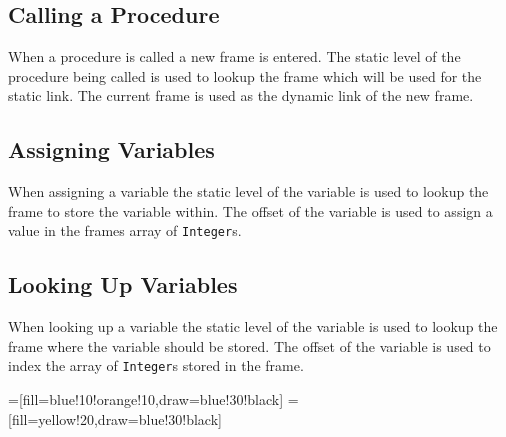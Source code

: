 \documentclass[a4paper,twoside,twocolumn]{article}
\begin{document}
\subsection{Calling a Procedure}\label{section:call}
When a procedure is called a new frame is entered. The static level of the
procedure being called is used to lookup the frame which will be used for the
static link. The current frame is used as the dynamic link of the new frame.

\subsection{Assigning Variables}\label{section:assignment}
When assigning a variable the static level of the variable is used to lookup
the frame to store the variable within. The offset of the variable is used
to assign a value in the frames array of \texttt{Integer}s.

\subsection{Looking Up Variables}\label{section:lookup}
When looking up a variable the static level of the variable is used to lookup
the frame where the variable should be stored. The offset of the variable is
used to index the array of \texttt{Integer}s stored in the frame.

=[fill=blue!10!orange!10,draw=blue!30!black]
=[fill=yellow!20,draw=blue!30!black]
\end{document}
